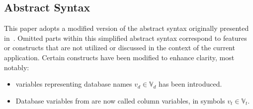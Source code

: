 \subsection{Abstract Syntax} \label{subsec:function-definitions}

This paper adopts a modified version of the abstract syntax originally presented in~\cite{cortesi_abstract_2013}.
Omitted parts within this simplified abstract syntax correspond to features or constructs that are not utilized or discussed in the context of the current application.
Certain constructs have been modified to enhance clarity, most notably:
\begin{itemize}
    \item variables representing database names $v_d \in \mathbb{V}_d$ has been introduced.
    \item Database variables from \cite{halder_abstract_2012} are now called column variables, in symbols $v_t \in \mathbb{V}_t$.
\end{itemize}

